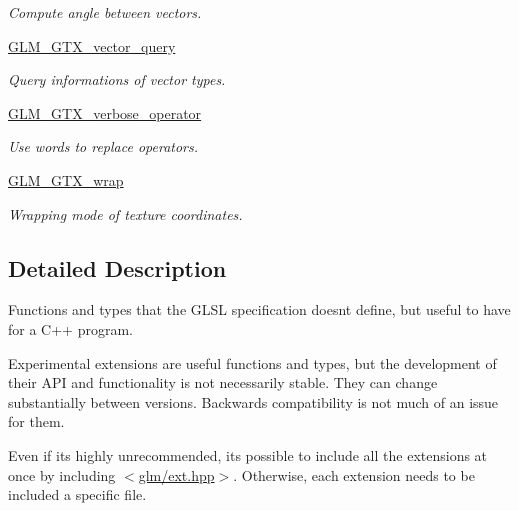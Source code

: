 \begin{DoxyCompactItemize}
\begin{DoxyCompactList}\small\item\em Compute angle between vectors. \end{DoxyCompactList}\item 
\hyperlink{group__gtx__vector__query}{G\+L\+M\+\_\+\+G\+T\+X\+\_\+vector\+\_\+query}
\begin{DoxyCompactList}\small\item\em Query informations of vector types. \end{DoxyCompactList}\item 
\hyperlink{group__gtx__verbose__operator}{G\+L\+M\+\_\+\+G\+T\+X\+\_\+verbose\+\_\+operator}
\begin{DoxyCompactList}\small\item\em Use words to replace operators. \end{DoxyCompactList}\item 
\hyperlink{group__gtx__wrap}{G\+L\+M\+\_\+\+G\+T\+X\+\_\+wrap}
\begin{DoxyCompactList}\small\item\em Wrapping mode of texture coordinates. \end{DoxyCompactList}\end{DoxyCompactItemize}


\subsection{Detailed Description}
Functions and types that the G\+L\+S\+L specification doesn\textquotesingle{}t define, but useful to have for a C++ program. 

Experimental extensions are useful functions and types, but the development of their A\+P\+I and functionality is not necessarily stable. They can change substantially between versions. Backwards compatibility is not much of an issue for them.

Even if it\textquotesingle{}s highly unrecommended, it\textquotesingle{}s possible to include all the extensions at once by including $<$\hyperlink{ext_8hpp_source}{glm/ext.\+hpp}$>$. Otherwise, each extension needs to be included a specific file. 